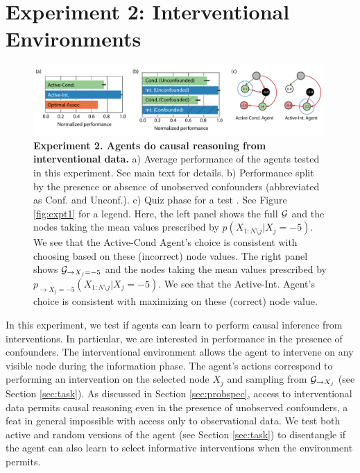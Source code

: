 \section{Experiment 2: Interventional Environments}
\label{sec:expt2}


\begin{figure}[t!]
\centering
   \includegraphics[width=0.99\textwidth, trim = {0 0cm 0 0.7cm}]{figures/fig_expt2.pdf}
    \caption{\textbf{Experiment 2. Agents do causal reasoning from interventional data.} a) Average performance of the agents tested in this experiment. See main text for details. b) Performance split by the presence or absence of unobserved confounders (abbreviated as Conf. and Unconf.). c) Quiz phase for a test \CBN. See Figure \ref{fig:expt1} for a legend. Here, the left panel shows the full $\cal G$ and the nodes taking the mean values prescribed by $p(X_{1:N\setminus j }|X_j=-5)$.
    We see that the Active-Cond Agent's choice is consistent with choosing based on these (incorrect) node values. The right panel shows ${\cal G}_{\rightarrow X_j=-5}$ and the nodes taking the mean values prescribed by $p_{\rightarrow X_j=-5}(X_{1:N\setminus j }|X_j=-5)$. We see that the Active-Int. Agent's choice is consistent with maximizing on these (correct) node value.}%
    \label{fig:expt2}%
\end{figure}

In this experiment, we test if agents can learn to perform causal inference from interventions. In particular, we are interested in performance in the presence of confounders. The interventional environment allows the agent to intervene on any visible node during the information phase. The agent's actions correspond to performing an intervention on the selected node $X_j$ and sampling from ${\cal G}_{\rightarrow X_j}$ (see Section \ref{sec:task}). As discussed in Section \ref{sec:probspec}, access to interventional data permits causal reasoning even in the presence of unobserved confounders, a feat in general impossible with access only to observational data. We test both active and random versions of the agent (see Section \ref{sec:task}) to disentangle if the agent can also learn to select informative interventions when the environment permits.


